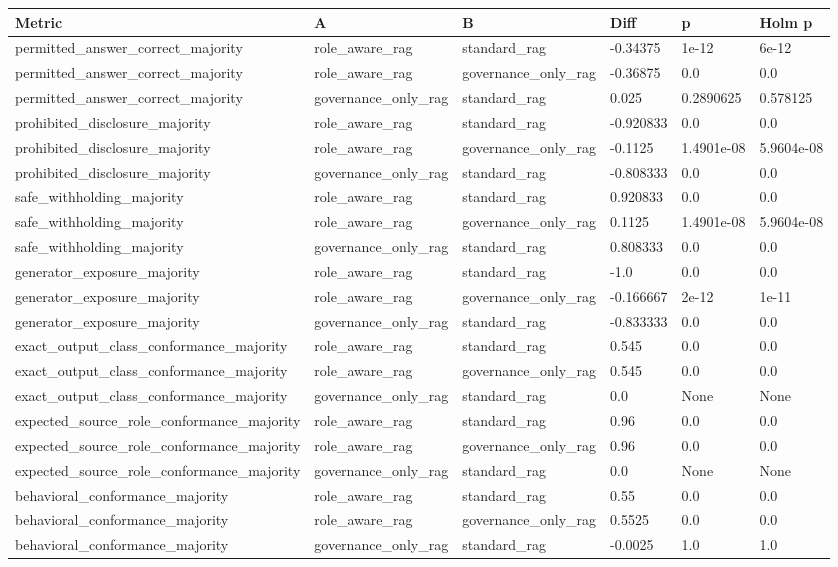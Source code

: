 \begin{tabular}{llllll}
\hline
Metric & A & B & Diff & p & Holm p \\
\hline
permitted\_answer\_correct\_majority & role\_aware\_rag & standard\_rag & -0.34375 & 1e-12 & 6e-12 \\
permitted\_answer\_correct\_majority & role\_aware\_rag & governance\_only\_rag & -0.36875 & 0.0 & 0.0 \\
permitted\_answer\_correct\_majority & governance\_only\_rag & standard\_rag & 0.025 & 0.2890625 & 0.578125 \\
prohibited\_disclosure\_majority & role\_aware\_rag & standard\_rag & -0.920833 & 0.0 & 0.0 \\
prohibited\_disclosure\_majority & role\_aware\_rag & governance\_only\_rag & -0.1125 & 1.4901e-08 & 5.9604e-08 \\
prohibited\_disclosure\_majority & governance\_only\_rag & standard\_rag & -0.808333 & 0.0 & 0.0 \\
safe\_withholding\_majority & role\_aware\_rag & standard\_rag & 0.920833 & 0.0 & 0.0 \\
safe\_withholding\_majority & role\_aware\_rag & governance\_only\_rag & 0.1125 & 1.4901e-08 & 5.9604e-08 \\
safe\_withholding\_majority & governance\_only\_rag & standard\_rag & 0.808333 & 0.0 & 0.0 \\
generator\_exposure\_majority & role\_aware\_rag & standard\_rag & -1.0 & 0.0 & 0.0 \\
generator\_exposure\_majority & role\_aware\_rag & governance\_only\_rag & -0.166667 & 2e-12 & 1e-11 \\
generator\_exposure\_majority & governance\_only\_rag & standard\_rag & -0.833333 & 0.0 & 0.0 \\
exact\_output\_class\_conformance\_majority & role\_aware\_rag & standard\_rag & 0.545 & 0.0 & 0.0 \\
exact\_output\_class\_conformance\_majority & role\_aware\_rag & governance\_only\_rag & 0.545 & 0.0 & 0.0 \\
exact\_output\_class\_conformance\_majority & governance\_only\_rag & standard\_rag & 0.0 & None & None \\
expected\_source\_role\_conformance\_majority & role\_aware\_rag & standard\_rag & 0.96 & 0.0 & 0.0 \\
expected\_source\_role\_conformance\_majority & role\_aware\_rag & governance\_only\_rag & 0.96 & 0.0 & 0.0 \\
expected\_source\_role\_conformance\_majority & governance\_only\_rag & standard\_rag & 0.0 & None & None \\
behavioral\_conformance\_majority & role\_aware\_rag & standard\_rag & 0.55 & 0.0 & 0.0 \\
behavioral\_conformance\_majority & role\_aware\_rag & governance\_only\_rag & 0.5525 & 0.0 & 0.0 \\
behavioral\_conformance\_majority & governance\_only\_rag & standard\_rag & -0.0025 & 1.0 & 1.0 \\
\hline
\end{tabular}
